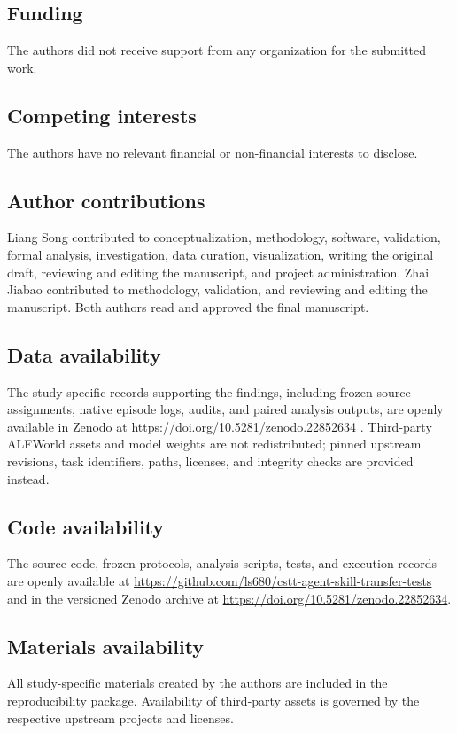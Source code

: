\documentclass[pdflatex,sn-mathphys-num]{sn-jnl}
\begin{document}
\subsection*{Funding}
The authors did not receive support from any organization for the submitted
work.

\subsection*{Competing interests}
The authors have no relevant financial or non-financial interests to disclose.

\subsection*{Author contributions}
Liang Song contributed to conceptualization, methodology, software, validation,
formal analysis, investigation, data curation, visualization, writing the
original draft, reviewing and editing the manuscript, and project
administration. Zhai Jiabao contributed to methodology, validation, and
reviewing and editing the manuscript. Both authors read and approved the final
manuscript.

\subsection*{Data availability}
The study-specific records supporting the findings, including frozen source
assignments, native episode logs, audits, and paired analysis outputs, are
openly available in Zenodo at
\url{https://doi.org/10.5281/zenodo.22852634} \citep{liang2026cstt}.
Third-party ALFWorld assets and model weights are not redistributed; pinned
upstream revisions, task identifiers, paths, licenses, and integrity checks are
provided instead.

\subsection*{Code availability}
The source code, frozen protocols, analysis scripts, tests, and execution
records are openly available at
\url{https://github.com/ls680/cstt-agent-skill-transfer-tests} and in the
versioned Zenodo archive at \url{https://doi.org/10.5281/zenodo.22852634}.

\subsection*{Materials availability}
All study-specific materials created by the authors are included in the
reproducibility package. Availability of third-party assets is governed by the
respective upstream projects and licenses.
\end{document}
